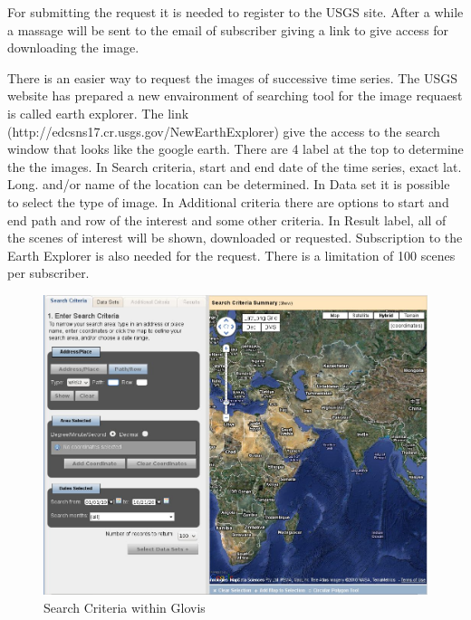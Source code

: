For submitting the request it is needed to register to the USGS site. After a while a massage will be sent to the email of subscriber giving a link to give access for downloading the image.\newline

There is an easier way to request the images of successive time series. The USGS website has prepared a new envaironment of searching tool for the image requaest is called earth explorer. The link (http://edcsns17.cr.usgs.gov/NewEarthExplorer) give the access to the search window that looks like the google earth. There are 4 label at the top to determine the the images. In Search criteria, start and end date of the time series, exact lat. Long. and/or name of the location can be determined. In Data set it is possible to select the type of image. In Additional criteria there are options to  start and end path and row of the interest and some other criteria. In Result label, all of the scenes of interest will be shown, downloaded or requested. Subscription to the Earth Explorer is also needed for the request. There is  a limitation of 100 scenes per subscriber.\newline

\begin{figure}[htbp]
   \centering
   \includegraphics[scale=0.3]{gipe003.png}
   \caption{Search Criteria within Glovis}
   \label{fig:gipe003}
\end{figure}

